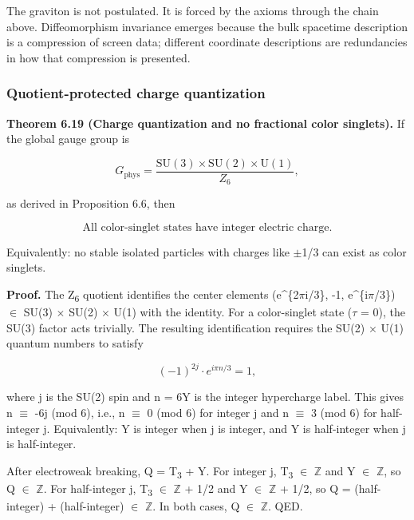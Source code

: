 The graviton is not postulated. It is forced by the axioms through the chain above. Diffeomorphism invariance emerges because the bulk spacetime description is a compression of screen data; different coordinate descriptions are redundancies in how that compression is presented.

\subsubsection{Quotient-protected charge quantization}\label{612-mass-predictions-from-symmetry}

\textbf{Theorem 6.19 (Charge quantization and no fractional color singlets).} If the global gauge group is

\[
G_{\mathrm{phys}} = \frac{\mathrm{SU}(3) \times \mathrm{SU}(2) \times \mathrm{U}(1)}{Z_6},
\]

as derived in Proposition 6.6, then

\[
\text{All color-singlet states have integer electric charge.}
\]

Equivalently: no stable isolated particles with charges like \ensuremath{\pm}1/3 can exist as color singlets.

\textbf{Proof.} The Z\textsubscript{6} quotient identifies the center elements (e\^{}\{2\ensuremath{\pi}i/3\}, -1, e\^{}\{i\ensuremath{\pi}/3\}) \ensuremath{\in} SU(3) \ensuremath{\times} SU(2) \ensuremath{\times} U(1) with the identity. For a color-singlet state (\ensuremath{\tau} = 0), the SU(3) factor acts trivially. The resulting identification requires the SU(2) \ensuremath{\times} U(1) quantum numbers to satisfy

\[
(-1)^{2j} \cdot e^{i\pi n/3} = 1,
\]

where j is the SU(2) spin and n = 6Y is the integer hypercharge label. This gives n \ensuremath{\equiv} -6j (mod 6), i.e., n \ensuremath{\equiv} 0 (mod 6) for integer j and n \ensuremath{\equiv} 3 (mod 6) for half-integer j. Equivalently: Y is integer when j is integer, and Y is half-integer when j is half-integer.

After electroweak breaking, Q = T\textsubscript{3} + Y. For integer j, T\textsubscript{3} \ensuremath{\in} \ensuremath{\mathbb{Z}} and Y \ensuremath{\in} \ensuremath{\mathbb{Z}}, so Q \ensuremath{\in} \ensuremath{\mathbb{Z}}. For half-integer j, T\textsubscript{3} \ensuremath{\in} \ensuremath{\mathbb{Z}} + 1/2 and Y \ensuremath{\in} \ensuremath{\mathbb{Z}} + 1/2, so Q = (half-integer) + (half-integer) \ensuremath{\in} \ensuremath{\mathbb{Z}}. In both cases, Q \ensuremath{\in} \ensuremath{\mathbb{Z}}. QED.

